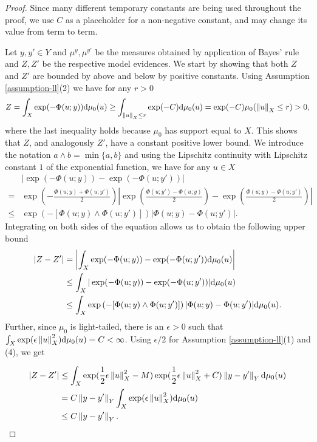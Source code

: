 \begin{proof}
  Since many different temporary constants are being used throughout the proof, we use $C$ as a placeholder for a non-negative constant, and may change its value from term to term.

  Let $y, y' \in Y$ and  $\mu^y, \mu^{y'}$ be the measures obtained by application of Bayes' rule and $Z, Z'$ be the respective model evidences. We start by showing that both $Z$ and $Z'$ are bounded by above and below by positive constants. Using Assumption \ref{assumption-ll}(2) we have for any $r > 0$
  \begin{equation*}
    Z = \int_X\exp(-\Phi(u; y))\text{d}\mu_0(u) \ge \int_{\left\lVert u\right\rVert_X \le r}\exp(-C)\text{d}\mu_0(u) = \exp(-C)\mu_0(\left\lVert u\right\rVert_X \le r) > 0,
  \end{equation*}
  where the last inequality holds because $\mu_0$ has support equal to $X$. This shows that $Z$, and analogously $Z'$, have a constant positive lower bound. We introduce the notation $a \land b = \min\{a, b\}$ and using the Lipschitz continuity with Lipschitz constant $1$ of the exponential function, we have for any $u \in X$
  \begin{align*}
    &|\exp(-\Phi(u; y)) - \exp(-\Phi(u; y'))|\\
    =&\exp\left(-\frac{\Phi(u; y) + \Phi(u; y')}{2}\right)\left|\exp\left(\frac{\Phi(u; y')-\Phi(u; y)}2\right) - \exp\left(\frac{\Phi(u; y)-\Phi(u; y')}2\right)\right|\\
    \leq&\exp\left(-[\Phi(u;y) \land \Phi(u; y')]\right)|\Phi(u;y) - \Phi(u; y')|.
  \end{align*}
  Integrating on both sides of the equation allows us to obtain the following upper bound
  \begin{align*}
    |Z - Z'|
    &=\left|\int_X\exp(-\Phi(u; y)) - \exp(-\Phi(u; y'))\text{d}\mu_0(u)\right|\\
    &\leq \int_X|\exp(-\Phi(u; y)) - \exp(-\Phi(u; y'))|\text{d}\mu_0(u)\\
    &\leq \int_X\exp\left(-[\Phi(u;y) \land \Phi(u; y')]\right)|\Phi(u;y) - \Phi(u; y')|\text{d}\mu_0(u).
  \end{align*}
  Further, since $\mu_0$ is light-tailed, there is an $\epsilon > 0$ such that $\int_X\exp(\epsilon \left\lVert u\right\rVert_X^2)\text{d} \mu_0(u) = C < \infty$. Using $\epsilon / 2$ for Assumption \ref{assumption-ll}(1) and (4), we get

  \begin{equation}\label{bound-z}
    \begin{aligned}
      |Z - Z'|
      &\le \int_X \exp(\frac12\epsilon\left\lVert u\right\rVert_X^2 - M)\exp(\frac12\epsilon\left\lVert u\right\rVert_X^2 + C)\left\lVert y - y'\right\rVert_Y \text{d}\mu_0(u) \\
      &= C  \left\lVert y - y'\right\rVert_Y \int_X \exp(\epsilon\left\lVert u\right\rVert_X^2) \text{d}\mu_0(u)\\
      &\le C\left\lVert y - y'\right\rVert_Y.
      \end{aligned}
  \end{equation}


\end{proof}
